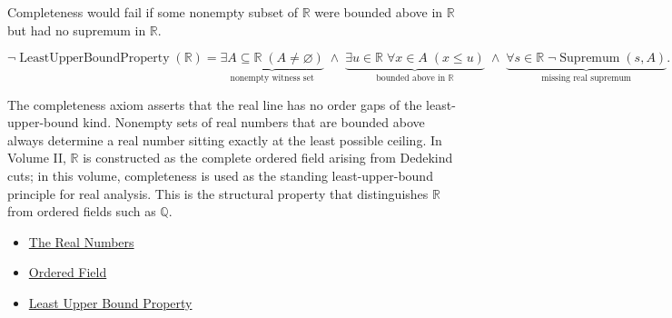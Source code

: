\begin{remark*}
Completeness would fail if some nonempty subset of $\mathbb{R}$ were bounded above in $\mathbb{R}$ but had no supremum in $\mathbb{R}$.
\end{remark*}

\begin{remark*}
\[
\neg\operatorname{LeastUpperBoundProperty}(\mathbb{R})
=
\underbrace{\exists A\subseteq\mathbb{R}\;(A\neq\varnothing)}_{\text{nonempty witness set}}
\;\land\;
\underbrace{\exists u\in\mathbb{R}\;\forall x\in A\;(x\le u)}_{\text{bounded above in }\mathbb{R}}
\;\land\;
\underbrace{\forall s\in\mathbb{R}\;\neg\operatorname{Supremum}(s,A)}_{\text{missing real supremum}}.
\]
\end{remark*}

\begin{remark*}[Interpretation]
The completeness axiom asserts that the real line has no order gaps of the least-upper-bound kind. Nonempty sets of real numbers that are bounded above always determine a real number sitting exactly at the least possible ceiling. In Volume II, $\mathbb{R}$ is constructed as the complete ordered field arising from Dedekind cuts; in this volume, completeness is used as the standing least-upper-bound principle for real analysis. This is the structural property that distinguishes $\mathbb{R}$ from ordered fields such as $\mathbb{Q}$.
\end{remark*}

\begin{dependencies}
\begin{itemize}
  \item \hyperref[def:reals]{The Real Numbers}
  \item \hyperref[def:real-ordered-field]{Ordered Field}
  \item \hyperref[def:least-upper-bound-property]{Least Upper Bound Property}
\end{itemize}
\end{dependencies}
